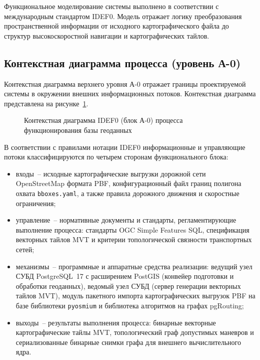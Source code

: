 Функциональное моделирование системы выполнено в соответствии с международным стандартом IDEF0. Модель отражает логику преобразования пространственной информации от исходного картографического файла до структур высокоскоростной навигации и картографических тайлов.

\subsection{Контекстная диаграмма процесса (уровень А-0)}

Контекстная диаграмма верхнего уровня А-0 отражает границы проектируемой системы в окружении внешних информационных потоков. Контекстная диаграмма представлена на рисунке~\ref{fig:idef0_a0}.

\begin{figure}[htbp]
    \centering
    
    \caption{Контекстная диаграмма IDEF0 (блок А-0) процесса функционирования базы геоданных}
    \label{fig:idef0_a0}
\end{figure}

В соответствии с правилами нотации IDEF0 информационные и управляющие потоки классифицируются по четырем сторонам функционального блока:
\begin{itemize}
    \item входы~-- исходные картографические выгрузки дорожной сети OpenStreetMap формата PBF, конфигурационный файл границ полигона охвата \texttt{bboxes.yaml}, а также правила дорожного движения и скоростные ограничения;
    \item управление~-- нормативные документы и стандарты, регламентирующие выполнение процесса: стандарты OGC Simple Features SQL, спецификация векторных тайлов MVT и критерии топологической связности транспортных сетей;
    \item механизмы~-- программные и аппаратные средства реализации: ведущий узел СУБД PostgreSQL~17 с расширением PostGIS (конвейер подготовки и обработки геоданных), ведомый узел СУБД (сервер генерации векторных тайлов MVT), модуль пакетного импорта картографических выгрузок PBF на базе библиотеки \texttt{pyosmium} и библиотека алгоритмов на графах pgRouting;
    \item выходы~-- результаты выполнения процесса: бинарные векторные картографические тайлы MVT, топологический граф допустимых маневров и сериализованные бинарные снимки графа для внешнего вычислительного ядра.
\end{itemize}

